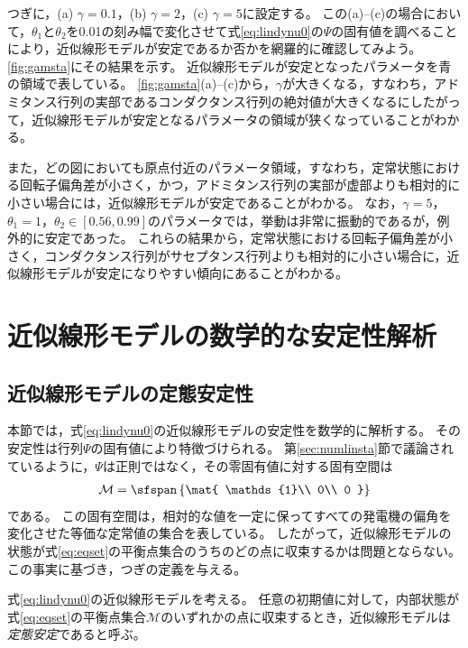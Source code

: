 \documentclass[tombow,dvipdfmx]{corona-a5}
\begin{document}
\begin{例}[近似線形モデルの数値的な安定性解析]
つぎに，(a) $\gamma=0.1$，(b) $\gamma=2$，(c) $\gamma=5$に設定する。
この(a)--(c)の場合において，$\theta_1$と$\theta_2$を0.01の刻み幅で変化させて式\ref{eq:lindynu0}の$\Psi$の固有値を調べることにより，近似線形モデルが安定であるか否かを網羅的に確認してみよう。
\ref{fig:gamsta}にその結果を示す。
近似線形モデルが安定となったパラメータを青の領域で表している。
\ref{fig:gamsta}(a)--(c)から，$\gamma$が大きくなる，すなわち，アドミタンス行列の実部であるコンダクタンス行列の絶対値が大きくなるにしたがって，近似線形モデルが安定となるパラメータの領域が狭くなっていることがわかる。

また，どの図においても原点付近のパラメータ領域，すなわち，定常状態における回転子偏角差が小さく，かつ，アドミタンス行列の実部が虚部よりも相対的に小さい場合には，近似線形モデルが安定であることがわかる。
なお，$\gamma=5$，$\theta_1=1$，$\theta_2 \in [0.56,0.99]$のパラメータでは，挙動は非常に振動的であるが，例外的に安定であった。
これらの結果から，定常状態における回転子偏角差が小さく，コンダクタンス行列がサセプタンス行列よりも相対的に小さい場合に，近似線形モデルが安定になりやすい傾向にあることがわかる。
\end{例}




\section{近似線形モデルの数学的な安定性解析\advanced}

\subsection{近似線形モデルの定態安定性\advanced}

本節では，式\ref{eq:lindynu0}の近似線形モデルの安定性を数学的に解析する。
その安定性は行列$\Psi$の固有値により特徴づけられる。
第\ref{sec:numlinsta}節で議論されているように，$\Psi$は正則ではなく，その零固有値に対する固有空間は
\begin{align}\label{eq:eqset}
\mathcal{M} =
 \sfspan\left\{
 \mat{
 \mathds{1}\\
 0\\
 0
 }
 \right\}
\end{align}
である。
この固有空間は，相対的な値を一定に保ってすべての発電機の偏角を変化させた等価な定常値の集合を表している。
したがって，近似線形モデルの状態が式\ref{eq:eqset}の平衡点集合のうちのどの点に収束するかは問題とならない。
この事実に基づき，つぎの定義を与える。

\begin{定義}[近似線形モデルの定態安定性]
\label{def:stalin}
式\ref{eq:lindynu0}の近似線形モデルを考える。
任意の初期値に対して，内部状態が式\ref{eq:eqset}の平衡点集合$\mathcal{M}$のいずれかの点に収束するとき，近似線形モデルは\emph{定態安定}であると呼ぶ。
\end{定義}
\end{document}
